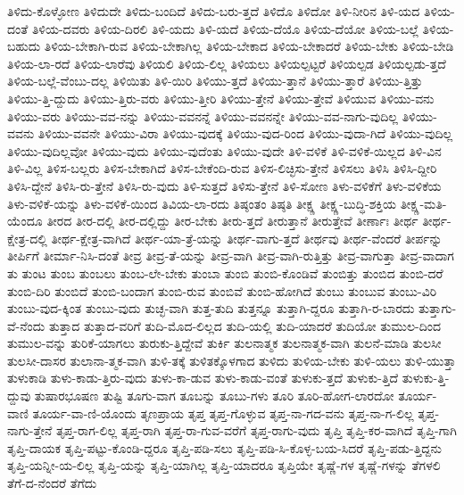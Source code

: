 {ತಿಳಿದು-ಕೊಳ್ಳೋಣ
ತಿಳಿದುದೇ
ತಿಳಿದು-ಬಂದಿದೆ
ತಿಳಿದು-ಬರು-ತ್ತದೆ
ತಿಳಿದೊ
ತಿಳಿದೋ
ತಿಳಿ-ನೀರಿನ
ತಿಳಿ-ಯದ
ತಿಳಿಯ-ದಂತೆ
ತಿಳಿಯ-ದವರು
ತಿಳಿಯ-ದಿರಲಿ
ತಿಳಿ-ಯದು
ತಿಳಿ-ಯದೆ
ತಿಳಿಯ-ದೆಯೊ
ತಿಳಿಯ-ದೆಯೋ
ತಿಳಿಯ-ಬಲ್ಲೆ
ತಿಳಿಯ-ಬಹುದು
ತಿಳಿಯ-ಬೇಕಾಗಿ-ರುವ
ತಿಳಿಯ-ಬೇಕಾಗಿಲ್ಲ
ತಿಳಿಯ-ಬೇಕಾದ
ತಿಳಿಯ-ಬೇಕಾದರೆ
ತಿಳಿಯ-ಬೇಕು
ತಿಳಿಯ-ಬೇಡಿ
ತಿಳಿಯ-ಲಾ-ರದೆ
ತಿಳಿಯ-ಲಾರೆವು
ತಿಳಿಯಲಿ
ತಿಳಿಯ-ಲಿಲ್ಲ
ತಿಳಿಯಲು
ತಿಳಿಯಲ್ಪಟ್ಟರೆ
ತಿಳಿಯಲ್ಪಡ
ತಿಳಿಯಲ್ಪಡು-ತ್ತದೆ
ತಿಳಿಯ-ಬಲ್ಲೆ-ವೆಂಬು-ದಲ್ಲ
ತಿಳಿಯಿತು
ತಿಳಿ-ಯಿರಿ
ತಿಳಿಯು-ತ್ತದೆ
ತಿಳಿಯು-ತ್ತಾನೆ
ತಿಳಿಯು-ತ್ತಾರೆ
ತಿಳಿಯು-ತ್ತಿತ್ತು
ತಿಳಿಯು-ತ್ತಿ-ದ್ದುದು
ತಿಳಿಯು-ತ್ತಿರು-ವರು
ತಿಳಿಯು-ತ್ತೀರಿ
ತಿಳಿಯು-ತ್ತೇನೆ
ತಿಳಿಯು-ತ್ತೇವೆ
ತಿಳಿಯುವ
ತಿಳಿಯು-ವನು
ತಿಳಿಯು-ವರು
ತಿಳಿಯು-ವವ-ನನ್ನು
ತಿಳಿಯು-ವವನನ್ನೆ
ತಿಳಿಯು-ವವನನ್ನೇ
ತಿಳಿಯು-ವವ-ನಾಗು-ವುದಿಲ್ಲ
ತಿಳಿಯು-ವವನು
ತಿಳಿಯು-ವವನೇ
ತಿಳಿಯು-ವಿರಾ
ತಿಳಿಯು-ವುದಕ್ಕೆ
ತಿಳಿಯು-ವುದ-ರಿಂದ
ತಿಳಿಯು-ವುದಾ-ಗಿದೆ
ತಿಳಿಯು-ವುದಿಲ್ಲ
ತಿಳಿಯು-ವುದಿಲ್ಲವೋ
ತಿಳಿಯು-ವುದು
ತಿಳಿಯು-ವುದೆಂತು
ತಿಳಿಯು-ವುದೇ
ತಿಳಿ-ವಳಿಕೆ
ತಿಳಿ-ವಳಿಕೆ-ಯಿಲ್ಲದ
ತಿಳಿ-ವಿನ
ತಿಳಿ-ವಿಲ್ಲ
ತಿಳಿಸ-ಬಲ್ಲರು
ತಿಳಿಸ-ಬೇಕಾಗಿದೆ
ತಿಳಿಸ-ಬೇಕೆಂದಿ-ರುವ
ತಿಳಿಸ-ಲಿಚ್ಛಿಸು-ತ್ತೇನೆ
ತಿಳಿಸಲು
ತಿಳಿಸಿ
ತಿಳಿಸಿ-ದ್ದೀರಿ
ತಿಳಿಸಿ-ದ್ದೇನೆ
ತಿಳಿಸಿ-ರು-ತ್ತೇನೆ
ತಿಳಿಸಿ-ರು-ವುದು
ತಿಳಿ-ಸುತ್ತದೆ
ತಿಳಿಸು-ತ್ತೇನೆ
ತಿಳಿ-ಸೋಣ
ತಿಳು-ವಳಿಕೆಗೆ
ತಿಳು-ವಳಿಕೆಯ
ತಿಳು-ವಳಿಕೆ-ಯನ್ನು
ತಿಳು-ವಳಿಕೆ-ಯಿಂದ
ತಿವಿಯ-ಲಾ-ರದು
ತಿಷ್ಠಂತಂ
ತಿಷ್ಠತಿ
ತೀಕ್ಷ್ಣ
ತೀಕ್ಷ್ಣ-ಬುದ್ಧಿ-ಶಕ್ತಿಯ
ತೀಕ್ಷ್ಣ-ಮತಿ-ಯೆಂದೂ
ತೀರದ
ತೀರ-ದಲ್ಲಿ
ತೀರ-ದಲ್ಲಿದ್ದು
ತೀರ-ಬೇಕು
ತೀರು-ತ್ತದೆ
ತೀರುತ್ತಾನೆ
ತೀರುತ್ತೇವೆ
ತೀರ್ಣಾಃ
ತೀರ್ಥ
ತೀರ್ಥ-ಕ್ಷೇತ್ರ-ದಲ್ಲಿ
ತೀರ್ಥ-ಕ್ಷೇತ್ರ-ವಾಗಿದೆ
ತೀರ್ಥ-ಯಾ-ತ್ರೆ-ಯನ್ನು
ತೀರ್ಥ-ವಾಗು-ತ್ತದೆ
ತೀರ್ಥವು
ತೀರ್ಥ-ವೆಂದರೆ
ತೀರ್ಪನ್ನು
ತೀರ್ಪಿಗೆ
ತೀರ್ಮಾ-ನಿಸಿ-ದಂತೆ
ತೀವ್ರ
ತೀವ್ರ-ತೆ-ಯನ್ನು
ತೀವ್ರ-ವಾಗಿ
ತೀವ್ರ-ವಾಗಿ-ರುತ್ತಿತ್ತು
ತೀವ್ರ-ವಾಗುತ್ತಾ
ತೀವ್ರ-ವಾದಾಗ
ತು
ತುಂಟ
ತುಂಬ
ತುಂಬಲು
ತುಂಬ-ಲೇ-ಬೇಕು
ತುಂಬಾ
ತುಂಬಿ
ತುಂಬಿ-ಕೊಂಡಿವೆ
ತುಂಬಿತ್ತು
ತುಂಬಿದ
ತುಂಬಿ-ದರೆ
ತುಂಬಿ-ದಿರಿ
ತುಂಬಿದೆ
ತುಂಬಿ-ಬಂದಾಗ
ತುಂಬಿ-ರುವ
ತುಂಬಿವೆ
ತುಂಬಿ-ಹೋಗಿದೆ
ತುಂಬು
ತುಂಬುವ
ತುಂಬು-ವಿರಿ
ತುಂಬು-ವುದ-ಕ್ಕಿಂತ
ತುಂಬು-ವುದು
ತುಚ್ಛ-ವಾಗಿ
ತುತ್ತ-ತುದಿ
ತುತ್ತನ್ನೂ
ತುತ್ತಾಗಿ-ದ್ದರೂ
ತುತ್ತಾಗಿ-ರ-ಬಾರದು
ತುತ್ತಾಗು-ವೆ-ನೆಂದು
ತುತ್ತಾದ
ತುತ್ತಾದ-ವರಿಗೆ
ತುದಿ-ಮೊದ-ಲಿಲ್ಲದ
ತುದಿ-ಯಲ್ಲಿ
ತುದಿ-ಯಾದರೆ
ತುದಿಯೋ
ತುಮುಲ-ದಿಂದ
ತುಮುಲ-ವನ್ನು
ತುರಿಕೆ-ಯಾಗಲು
ತುರುಕು-ತ್ತಿದ್ದೇವೆ
ತುರ್ಕಿ
ತುಲನಾತ್ಮಕ
ತುಲನಾತ್ಮಕ-ವಾಗಿ
ತುಲನೆ-ಮಾಡಿ
ತುಲಸೀ
ತುಲಸೀ-ದಾಸರ
ತುಲಾನಾ-ತ್ಮಕ-ವಾಗಿ
ತುಳಿ-ತಕ್ಕೆ
ತುಳಿತಕ್ಕೊಳಗಾದ
ತುಳಿದು
ತುಳಿಯ-ಬೇಕು
ತುಳಿ-ಯಲು
ತುಳಿ-ಯುತ್ತಾ
ತುಳುಕಾಡಿ
ತುಳು-ಕಾಡು-ತ್ತಿರು-ವುದು
ತುಳು-ಕಾ-ಡುವ
ತುಳು-ಕಾಡು-ವಂತೆ
ತುಳುಕು-ತ್ತದೆ
ತುಳುಕು-ತ್ತಿದೆ
ತುಳುಕು-ತ್ತಿ-ದ್ದುವು
ತುಷಾರಭೂಷಣ
ತುಷ್ಟಿ
ತೂಗು-ವಾಗ
ತೂಬನ್ನು
ತೂಬು-ಗಳು
ತೂರಿ
ತೂರಿ-ಹೋಗ-ಲಾರದೋ
ತೂರ್ಯ-ವಾಣಿ
ತೂರ್ಯ-ವಾ-ಣಿ-ಯೊಂದು
ತೃಣಪ್ರಾಯ
ತೃಪ್ತ
ತೃಪ್ತ-ಗೊಳ್ಳುವ
ತೃಪ್ತ-ನಾ-ಗದ-ವನು
ತೃಪ್ತ-ನಾ-ಗ-ಲಿಲ್ಲ
ತೃಪ್ತ-ನಾಗು-ತ್ತೇನೆ
ತೃಪ್ತ-ರಾಗ-ಲಿಲ್ಲ
ತೃಪ್ತ-ರಾಗಿ
ತೃಪ್ತ-ರಾ-ಗುವ-ವರೆಗೆ
ತೃಪ್ತ-ರಾಗು-ವುದು
ತೃಪ್ತಿ
ತೃಪ್ತಿ-ಕರ-ವಾಗಿದೆ
ತೃಪ್ತಿ-ಗಾಗಿ
ತೃಪ್ತಿ-ದಾಯಕ
ತೃಪ್ತಿ-ಪಟ್ಟು-ಕೊಂಡಿ-ದ್ದರೂ
ತೃಪ್ತಿ-ಪಡಿ-ಸಲು
ತೃಪ್ತಿ-ಪಡಿ-ಸಿ-ಕೊಳ್ಳ-ಬಯ-ಸಿದರೆ
ತೃಪ್ತಿ-ಪಡು-ತ್ತಿದ್ದನು
ತೃಪ್ತಿ-ಯನ್ನೀ-ಯ-ಲಿಲ್ಲ
ತೃಪ್ತಿ-ಯನ್ನು
ತೃಪ್ತಿ-ಯಾಗಿಲ್ಲ
ತೃಪ್ತಿ-ಯಾದರೂ
ತೃಪ್ತಿಯೇ
ತೃಷ್ಣೆ-ಗಳ
ತೃಷ್ಣೆ-ಗಳನ್ನು
ತೆಗಳಲಿ
ತೆಗೆ-ದ-ನೆಂದರೆ
ತೆಗೆದು
}
